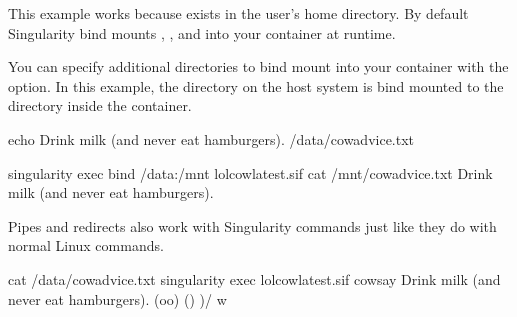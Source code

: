 \documentclass[letterpaper,10pt,english]{sphinxmanual}
\begin{document}
This example works because  exists in the user’s home directory.
By default Singularity bind mounts , , and  into
your container at runtime.

You can specify additional directories to bind mount into your container with
the  option. In this example, the 
directory on the host system is bind mounted to the  directory inside
the container.

%
\begin{sphinxVerbatim}[commandchars=\\\{\}]
\PYGZdl{} echo \PYGZdq{}Drink milk (and never eat hamburgers).\PYGZdq{} \PYGZgt{} /data/cow\PYGZus{}advice.txt

\PYGZdl{} singularity exec \PYGZhy{}\PYGZhy{}bind /data:/mnt lolcow\PYGZus{}latest.sif cat /mnt/cow\PYGZus{}advice.txt
Drink milk (and never eat hamburgers).
\end{sphinxVerbatim}

Pipes and redirects also work with Singularity commands just like they do with
normal Linux commands.

%
\begin{sphinxVerbatim}[commandchars=\\\{\}]
\PYGZdl{} cat /data/cow\PYGZus{}advice.txt \textbar{} singularity exec lolcow\PYGZus{}latest.sif cowsay
 \PYGZus{}\PYGZus{}\PYGZus{}\PYGZus{}\PYGZus{}\PYGZus{}\PYGZus{}\PYGZus{}\PYGZus{}\PYGZus{}\PYGZus{}\PYGZus{}\PYGZus{}\PYGZus{}\PYGZus{}\PYGZus{}\PYGZus{}\PYGZus{}\PYGZus{}\PYGZus{}\PYGZus{}\PYGZus{}\PYGZus{}\PYGZus{}\PYGZus{}\PYGZus{}\PYGZus{}\PYGZus{}\PYGZus{}\PYGZus{}\PYGZus{}\PYGZus{}\PYGZus{}\PYGZus{}\PYGZus{}\PYGZus{}\PYGZus{}\PYGZus{}\PYGZus{}\PYGZus{}
\PYGZlt{} Drink milk (and never eat hamburgers). \PYGZgt{}
 \PYGZhy{}\PYGZhy{}\PYGZhy{}\PYGZhy{}\PYGZhy{}\PYGZhy{}\PYGZhy{}\PYGZhy{}\PYGZhy{}\PYGZhy{}\PYGZhy{}\PYGZhy{}\PYGZhy{}\PYGZhy{}\PYGZhy{}\PYGZhy{}\PYGZhy{}\PYGZhy{}\PYGZhy{}\PYGZhy{}\PYGZhy{}\PYGZhy{}\PYGZhy{}\PYGZhy{}\PYGZhy{}\PYGZhy{}\PYGZhy{}\PYGZhy{}\PYGZhy{}\PYGZhy{}\PYGZhy{}\PYGZhy{}\PYGZhy{}\PYGZhy{}\PYGZhy{}\PYGZhy{}\PYGZhy{}\PYGZhy{}\PYGZhy{}\PYGZhy{}
        \PYGZbs{}   \PYGZca{}\PYGZus{}\PYGZus{}\PYGZca{}
         \PYGZbs{}  (oo)\PYGZbs{}\PYGZus{}\PYGZus{}\PYGZus{}\PYGZus{}\PYGZus{}\PYGZus{}\PYGZus{}
            (\PYGZus{}\PYGZus{})\PYGZbs{}       )\PYGZbs{}/\PYGZbs{}
                \textbar{}\textbar{}\PYGZhy{}\PYGZhy{}\PYGZhy{}\PYGZhy{}w \textbar{}
                \textbar{}\textbar{}     \textbar{}\textbar{}
\end{sphinxVerbatim}
\end{document}
